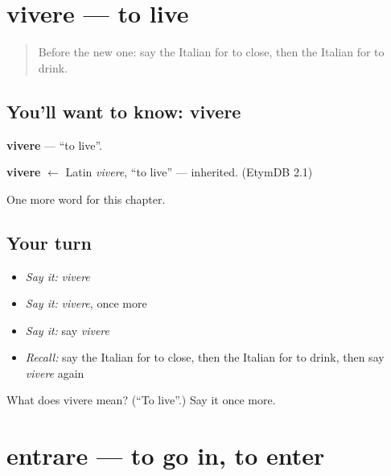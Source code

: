 \section[vivere]{vivere — to live}

\label{lesson:IT-C50-vivere}



\begin{quote}
Before the new one: say the Italian for to close, then the Italian for to drink.
\end{quote}

\subsection*{You'll want to know: vivere}
\textbf{vivere} — \textquotedblleft{}to live\textquotedblright{}.

\begin{cousinweb}
\textbf{vivere} $\leftarrow$ Latin \emph{vivere}, \textquotedblleft{}to live\textquotedblright{} — inherited. (EtymDB 2.1)
\end{cousinweb}

\begin{grammarlens}[title={What you've built}]
One more word for this chapter.
\end{grammarlens}

\subsection*{Your turn}
\begin{itemize}
\raggedright
  \item \emph{Say it:} \emph{vivere}
  \item \emph{Say it:} \emph{vivere}, once more
  \item \emph{Say it:} say \emph{vivere}
  \item \emph{Recall:} say the Italian for to close, then the Italian for to drink, then say \emph{vivere} again
\end{itemize}

\begin{tcolorbox}[breakable,colback=teal!4,colframe=teal!35!black,title={Before you move on}]
What does vivere mean? (\textquotedblleft{}To live\textquotedblright{}.) Say it once more.
\end{tcolorbox}
\section[entrare]{entrare — to go in, to enter}

